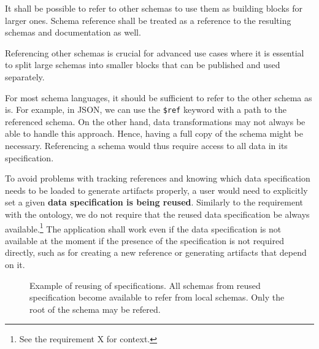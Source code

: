 \begin{requirement}
  It shall be possible to refer to other schemas to use them as building blocks for larger ones. Schema reference shall be treated as a reference to the resulting schemas and documentation as well.
  \label{analysis/requirement/schema-reference}
\end{requirement}

Referencing other schemas is crucial for advanced use cases where it is essential to split large schemas into smaller blocks that can be published and used separately.

For most schema languages, it should be sufficient to refer to the other schema as is. For example, in JSON, we can use the \verb|$ref| keyword with a path to the referenced schema. On the other hand, data transformations may not always be able to handle this approach. Hence, having a full copy of the schema might be necessary. Referencing a schema would thus require access to all data in its specification.

To avoid problems with tracking references and knowing which data specification needs to be loaded to generate artifacts properly, a user would need to explicitly set a given \textbf{data specification is being reused}. Similarly to the requirement with the ontology, we do not require that the reused data specification be always available.\footnote{See the requirement X for context.} The application shall work even if the data specification is not available at the moment if the presence of the specification is not required directly, such as for creating a new reference or generating artifacts that depend on it.

\begin{figure}[h!]\centering
  \caption{Example of reusing of specifications. All schemas from reused specification become available to refer from local schemas. Only the root of the schema may be refered.}
\end{figure}